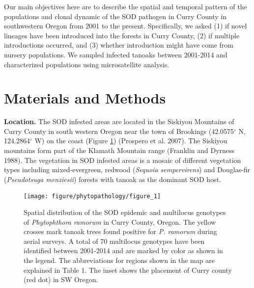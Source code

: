 \documentclass[double,12pt]{beavtex}
\begin{document}
  Our main objectives here are to describe the spatial and temporal
  pattern of the populations and clonal dynamic of the SOD pathogen in
  Curry County in southwestern Oregon from 2001 to the present.
  Specifically, we asked (1) if novel lineages have been introduced into
  the forests in Curry County, (2) if multiple introductions occurred, and
  (3) whether introduction might have come from nursery populations. We
  sampled infected tanoaks between 2001-2014 and characterized populations
  using microsatellite analysis.
  
  \section{Materials and Methods}\label{materials-and-methods}
  
  \textbf{Location.} The SOD infested areas are located in the Siskiyou
  Mountains of Curry County in south western Oregon near the town of
  Brookings (42.0575\(^{\circ}\) N, 124.2864\(^{\circ}\) W) on the coast
  (Figure \ref{fig:ramorum1}) (Prospero et al. 2007). The Siskiyou
  mountains form part of the Klamath Mountain range (Franklin and Dyrness
  1988). The vegetation in SOD infested areas is a mosaic of different
  vegetation types including mixed-evergreen, redwood (\emph{Sequoia
  sempervirens}) and Douglas-fir (\emph{Pseudotsuga menziesii}) forests
  with tanoak as the dominant SOD host.
  
  \begin{figure}
  
  {\centering \texttt{[image: figure/phytopathology/figure\_1]} 
  
  }
  
  \caption[Spatial distribution of the SOD epidemic and multilocus genotypes of
  \emph{Phytophthora ramorum} in Curry County, Oregon.]{Spatial distribution of the SOD epidemic and multilocus genotypes of
  \emph{Phytophthora ramorum} in Curry County, Oregon. The yellow crosses
  mark tanoak trees found positive for \emph{P. ramorum} during aerial
  surveys. A total of 70 multilocus genotypes have been identified between
  2001-2014 and are marked by color as shown in the legend. The
  abbreviations for regions shown in the map are explained in Table 1. The
  inset shows the placement of Curry county (red dot) in SW Oregon.}\label{fig:ramorum1}
  \end{figure}
  
\end{document}
